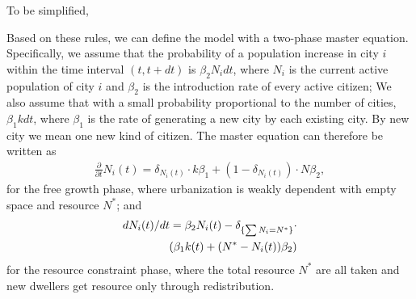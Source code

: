 \documentclass[reprint,unsortedaddress,amsmath,amssymb,aps,prl,showkeys]{revtex4-2}
\begin{document}
To be simplified, 



Based on these rules, we can define the model with a two-phase master equation. Specifically, we assume that the probability of a population increase in city $i$ within the time interval $(t,t+dt)$ is $\beta_2N_idt$, where $N_i$ is the current active population of city $i$ and $\beta_2$ is the introduction rate of every active citizen;
We also assume that with a small probability proportional to the number of cities, $\beta_1kdt$, where $\beta_1$ is the rate of generating a new city by each existing city. By new city we mean one new kind of citizen. %
The master equation can therefore be written as \begin{align}\frac{\partial}{\partial t}N_i(t) =  \delta_{N_i(t)}\cdot k\beta_1+ (1-\delta_{N_i(t)})\cdot N\beta_2, \end{align} for the free growth phase, where urbanization is weakly dependent with empty space and resource $N^*$;
and \begin{align}
dN_i(t)/dt = \beta_2 N_i(t) -\delta_{\{\sum N_i = N^*\}}\cdot\notag \\ \left(\beta_1k(t) + (N^*-N_i(t))\beta_2 \right)
\end{align}
for the resource constraint phase, where the total resource $N^*$ are all taken and new dwellers get resource only through redistribution. 
\end{document}
